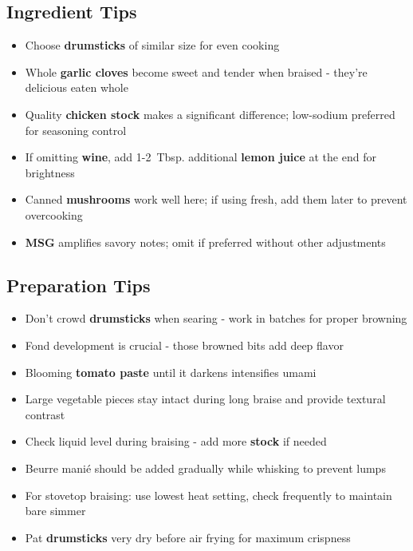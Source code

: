 \documentclass[11pt,letterpaper]{article}
\begin{document}
{\begin{multicols}{2}
\subsection*{Ingredient Tips}
\begin{itemize}
    \item Choose \textbf{drumsticks} of similar size for even cooking
    \item Whole \textbf{garlic cloves} become sweet and tender when braised - they're delicious eaten whole
    \item Quality \textbf{chicken stock} makes a significant difference; low-sodium preferred for seasoning control
    \item If omitting \textbf{wine}, add 1-2~Tbsp. additional \textbf{lemon juice} at the end for brightness
    \item Canned \textbf{mushrooms} work well here; if using fresh, add them later to prevent overcooking
    \item \textbf{MSG} amplifies savory notes; omit if preferred without other adjustments
\end{itemize}

\subsection*{Preparation Tips}
\begin{itemize}
    \item Don't crowd \textbf{drumsticks} when searing - work in batches for proper browning
    \item Fond development is crucial - those browned bits add deep flavor
    \item Blooming \textbf{tomato paste} until it darkens intensifies umami
    \item Large vegetable pieces stay intact during long braise and provide textural contrast
    \item Check liquid level during braising - add more \textbf{stock} if needed
    \item Beurre manié should be added gradually while whisking to prevent lumps
    \item For stovetop braising: use lowest heat setting, check frequently to maintain bare simmer
    \item Pat \textbf{drumsticks} very dry before air frying for maximum crispness
\end{itemize}


\end{multicols}}
\end{document}
